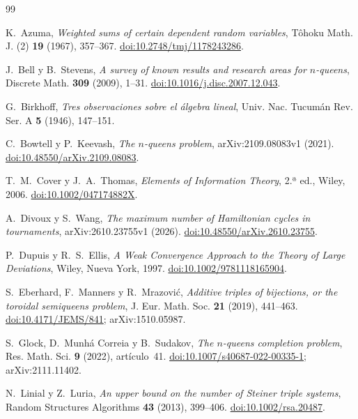 \begin{thebibliography}{99}
\raggedright

 K.~Azuma, \emph{Weighted sums of certain dependent random variables},
T\^ohoku Math. J. (2) \textbf{19} (1967), 357--367.
\href{https://doi.org/10.2748/tmj/1178243286}{doi:10.2748/tmj/1178243286}.

 J.~Bell y B.~Stevens, \emph{A survey of known results and research areas for
$n$-queens}, Discrete Math. \textbf{309} (2009), 1--31.
\href{https://doi.org/10.1016/j.disc.2007.12.043}{doi:10.1016/j.disc.2007.12.043}.

 G.~Birkhoff, \emph{Tres observaciones sobre el álgebra lineal},
Univ. Nac. Tucumán Rev. Ser. A \textbf{5} (1946), 147--151.

 C.~Bowtell y P.~Keevash, \emph{The $n$-queens problem}, arXiv:2109.08083v1 (2021).
\href{https://doi.org/10.48550/arXiv.2109.08083}{doi:10.48550/arXiv.2109.08083}.

 T.~M.~Cover y J.~A.~Thomas, \emph{Elements of Information Theory}, 2.ª ed., Wiley,
2006. \href{https://doi.org/10.1002/047174882X}{doi:10.1002/047174882X}.

 A.~Divoux y S.~Wang, \emph{The maximum number of Hamiltonian cycles in tournaments},
arXiv:2610.23755v1 (2026).
\href{https://doi.org/10.48550/arXiv.2610.23755}{doi:10.48550/arXiv.2610.23755}.

 P.~Dupuis y R.~S.~Ellis, \emph{A Weak Convergence Approach to the Theory of Large
Deviations}, Wiley, Nueva York, 1997.
\href{https://doi.org/10.1002/9781118165904}{doi:10.1002/9781118165904}.

 S.~Eberhard, F.~Manners y R.~Mrazović, \emph{Additive triples of bijections, or the
toroidal semiqueens problem}, J. Eur. Math. Soc. \textbf{21} (2019), 441--463.
\href{https://doi.org/10.4171/JEMS/841}{doi:10.4171/JEMS/841}; arXiv:1510.05987.

 S.~Glock, D.~Munhá Correia y B.~Sudakov, \emph{The $n$-queens completion problem},
Res. Math. Sci. \textbf{9} (2022), artículo~41.
\href{https://doi.org/10.1007/s40687-022-00335-1}{doi:10.1007/s40687-022-00335-1};
arXiv:2111.11402.

 N.~Linial y Z.~Luria, \emph{An upper bound on the number of Steiner triple
systems}, Random Structures Algorithms \textbf{43} (2013), 399--406.
\href{https://doi.org/10.1002/rsa.20487}{doi:10.1002/rsa.20487}.


\end{thebibliography}
